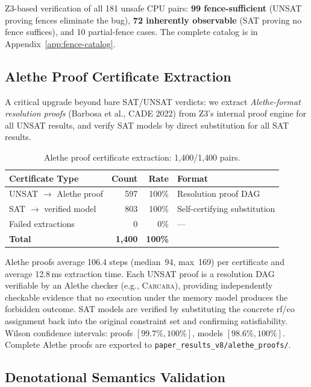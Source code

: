 \documentclass[11pt]{article}
\begin{document}
Z3-based verification of all 181 unsafe CPU pairs:
\textbf{99 fence-sufficient} (UNSAT proving fences eliminate the bug),
\textbf{72 inherently observable} (SAT proving no fence suffices),
and 10 partial-fence cases.
The complete catalog is in Appendix~\ref{app:fence-catalog}.

\subsection{Alethe Proof Certificate Extraction}
\label{sec:alethe-proofs}

A critical upgrade beyond bare SAT/UNSAT verdicts: we extract
\emph{Alethe-format resolution proofs} (Barbosa et al., CADE 2022)
from Z3's internal proof engine for all UNSAT results, and verify
SAT models by direct substitution for all SAT results.

\begin{table}[ht]
\centering
\caption{Alethe proof certificate extraction: 1{,}400/1{,}400 pairs.}
\label{tab:alethe-proofs}
\small
\begin{tabular}{lrrl}
\toprule
\textbf{Certificate Type} & \textbf{Count} & \textbf{Rate} & \textbf{Format} \\
\midrule
UNSAT $\to$ Alethe proof  & 597 & 100\% & Resolution proof DAG \\
SAT $\to$ verified model  & 803     & 100\% & Self-certifying substitution \\
Failed extractions        & 0       & 0\%   & --- \\
\midrule
\textbf{Total}            & \textbf{1{,}400} & \textbf{100\%} & \\
\bottomrule
\end{tabular}
\end{table}

\noindent
Alethe proofs average 106.4 steps (median~94, max~169) per certificate
and average 12.8\,ms extraction time.
Each UNSAT proof is a resolution DAG verifiable by an Alethe checker
(e.g., \textsc{Carcara}), providing independently checkable evidence
that no execution under the memory model produces the forbidden outcome.
SAT models are verified by substituting the concrete rf/co assignment
back into the original constraint set and confirming satisfiability.
Wilson confidence intervals: proofs $[99.7\%, 100\%]$,
models $[98.6\%, 100\%]$.
Complete Alethe proofs are exported to \texttt{paper\_results\_v8/alethe\_proofs/}.

\subsection{Denotational Semantics Validation}
\label{sec:denotational-semantics}
\end{document}
